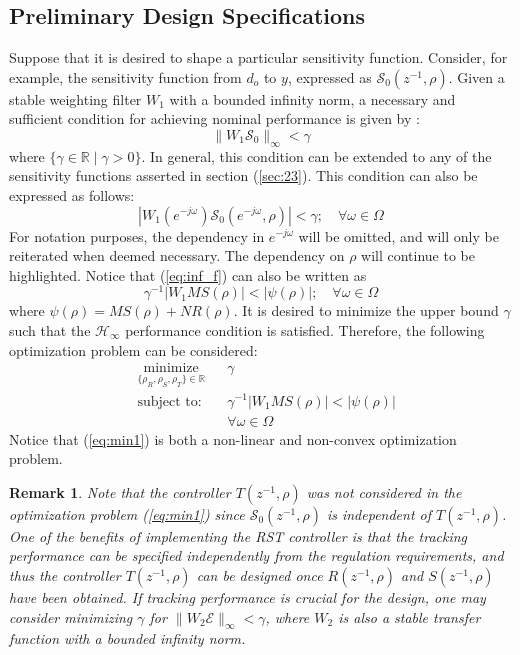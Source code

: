 \documentclass[a4paper, 10pt, conference]{ieeeconf}
\newtheorem*{remark}{Remark}
\begin{document}
\subsection{Preliminary Design Specifications}
Suppose that it is desired to shape a particular sensitivity function. Consider, for example, the sensitivity function from $d_o$ to $y$, expressed as $\mathcal{S}_0(z^{-1},\rho)$. Given a stable weighting filter $W_1$ with a bounded infinity norm, a necessary and sufficient condition for achieving nominal performance is given by \cite{Zho98}:
\begin{equation} \label{eq:inf1}
\| W_1\mathcal{S}_0 \|_{\infty}<\gamma
\end{equation}
where $\{ \gamma \in \mathbb{R} \mid \gamma > 0 \}$. In general, this condition can be extended to any of the sensitivity functions asserted in section (\ref{sec:23}). This condition can also be expressed as follows:
\begin{equation} \label{eq:inf_f}
 |W_1(e^{-j\omega}) \mathcal{S}_0(e^{-j\omega},\rho)| < \gamma; \quad \forall \omega \in \Omega
\end{equation}
For notation purposes, the dependency in $e^{-j\omega}$ will be omitted, and will only be reiterated when deemed necessary. The dependency on $\rho$ will continue to be highlighted. Notice that (\ref{eq:inf_f}) can also be written as
\begin{equation} \label{eq:circle}
\gamma^{-1}|W_1MS(\rho)| < |\psi(\rho)| ; \quad \forall \omega \in \Omega
\end{equation}
where $\psi(\rho) = MS(\rho) + NR(\rho)$. It is desired to minimize the upper bound $\gamma$ such that the $\mathcal{H}_{\infty}$ performance condition is satisfied. %
Therefore, the following optimization problem can be considered:
\begin{equation} \label{eq:min1}
\begin{aligned}
& \underset{ \{\rho_R,\rho_S,\rho_T\} \in \mathbb{R}}{\text{minimize}}
& & \gamma  \\
& \text{subject to:} & & \gamma^{-1} |W_1MS(\rho)| < |\psi(\rho)|  \\ 
& & & \forall \omega \in \Omega
\end{aligned}
\end{equation}
Notice that (\ref{eq:min1}) is both a non-linear and non-convex optimization problem. 
\begin{remark}
Note that the controller $T(z^{-1},\rho)$ was not considered in the optimization problem (\ref{eq:min1}) since $\mathcal{S}_0(z^{-1},\rho)$ is independent of $T(z^{-1},\rho)$. One of the benefits of implementing the RST controller is that the tracking performance can be specified independently from the regulation requirements, and thus the controller $T(z^{-1},\rho)$ can be designed once $R(z^{-1},\rho)$ and $S(z^{-1},\rho)$ have been obtained. If tracking performance is crucial for the design, one may consider minimizing $\gamma$ for $\|W_2\mathcal{E} \| _{\infty}<\gamma$, where $W_2$ is also a stable transfer function with a bounded infinity norm. 
\end{remark}
\end{document}
